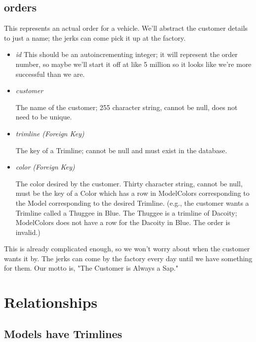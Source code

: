 \documentclass[11pt,letterpaper,oneside]{amsart}
\begin{document}
\subsection*{orders}

This represents an actual order for a vehicle.  We'll abstract the customer details to just a name; the jerks can come pick it up at the factory.

\begin{itemize}

\item \emph{id}
	This should be an autoincrementing integer; it will represent the order number, so maybe we'll start it off at like 5 million so it looks like we're more successful than we are.

\item \emph{customer}

	The name of the customer; 255 character string, cannot be null, does not need to be unique.
	
\item \emph{trimline (Foreign Key)}
	
	The key of a Trimline; cannot be null and must exist in the database.
	
\item \emph{color (Foreign Key)}

	The color desired by the customer.  Thirty character string, cannot be null, must be the key of a Color which has a row in ModelColors corresponding to the Model corresponding to the desired Trimline.  (e.g., the customer wants a Trimline called a Thuggee in Blue.  The Thuggee is a trimline of Dacoity; ModelColors does not have a row for the Dacoity in Blue.  The order is invalid.)
	
\end{itemize}

This is already complicated enough, so we won't worry about when the customer wants it by.  The jerks can come by the factory every day until we have something for them.  Our motto is, "The Customer is Always a Sap."

\section*{Relationships}

\subsection*{Models have Trimlines}
\end{document}
